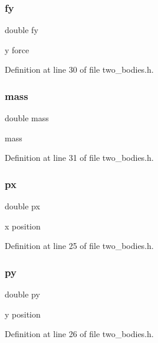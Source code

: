 \mbox{\label{struct__body_a03c4ce20c7e4b8c6d60a20b833be69fe}} 
\subsubsection{\texorpdfstring{fy}{fy}}
{\footnotesize\ttfamily double fy}

y force 

Definition at line 30 of file two\+\_\+bodies.\+h.

\mbox{\label{struct__body_a244bf42c46054cf1113be44d55f2156d}} 
\subsubsection{\texorpdfstring{mass}{mass}}
{\footnotesize\ttfamily double mass}

mass 

Definition at line 31 of file two\+\_\+bodies.\+h.

\mbox{\label{struct__body_a9c1e50fd3234caf28c5f65a912b5c16a}} 
\subsubsection{\texorpdfstring{px}{px}}
{\footnotesize\ttfamily double px}

x position 

Definition at line 25 of file two\+\_\+bodies.\+h.

\mbox{\label{struct__body_ad29ba68eddcdfabc5dd4e8e213a0f5cd}} 
\subsubsection{\texorpdfstring{py}{py}}
{\footnotesize\ttfamily double py}

y position 

Definition at line 26 of file two\+\_\+bodies.\+h.

\mbox{\label{struct__body_a2d31cc80a747457c212675a58c68b2b1}} 
